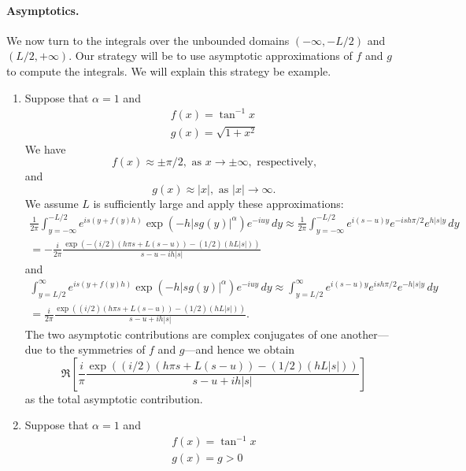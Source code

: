 \documentclass[11pt,letterpaper]{article}
\begin{document}
\paragraph{Asymptotics.} We now turn to the integrals over the unbounded domains $(-\infty, -L/2)$ and $(L/2, +\infty)$. Our strategy will be to use asymptotic approximations of $f$ and $g$ to compute the integrals. We will explain this strategy be example.

\begin{enumerate}
\item Suppose that $\alpha = 1$ and
\begin{gather*}
f(x) = \tan^{-1} x \\
g(x) = \sqrt{1 + x^2}
\end{gather*}
We have
\[
f(x) \approx \pm \pi/2, \text{ as } x \to \pm \infty, \text{ respectively,}
\]
and
\[
g(x) \approx |x|, \text{ as } |x| \to \infty.
\]
We assume $L$ is sufficiently large and apply these approximations:
\begin{multline*}
\frac{1}{2 \pi} \int_{y=-\infty}^{-L/2} e^{is\left(y+f(y)h\right)}\exp{\left(  -h |s g(y)|^{\alpha} \right)}e^{-iuy}\, dy \approx \frac{1}{2 \pi} \int_{y=-\infty}^{-L/2} e^{i(s-u)y} e^{-i s h \pi/2} e^{h |s| y} \, dy \\
 = - \frac{i}{2 \pi} \frac{\exp \left( - (i/2)(h \pi s + L(s-u)) - (1/2)(h L |s|) \right)}{s - u - i h |s|}
\end{multline*}
and
\begin{multline*}
\int_{y=L/2}^{\infty} e^{is\left(y+f(y)h\right)}\exp{\left(  -h |s g(y)|^{\alpha} \right)}e^{-iuy}\, dy \approx \int_{y=L/2}^{\infty} e^{i(s-u)y} e^{i s h \pi/2} e^{-h |s| y} \, dy \\
 = \frac{i}{2 \pi} \frac{\exp \left( (i/2)(h \pi s + L(s-u)) - (1/2)(h L |s|) \right)}{s - u + i h |s|}.
\end{multline*}
The two asymptotic contributions are complex conjugates of one another---due to the symmetries of $f$ and $g$---and hence we obtain
\begin{equation}
\label{eqn:asympcalc}
\Re \left[ \frac{i}{\pi} \frac{\exp \left( (i/2)(h \pi s + L(s-u)) - (1/2)(h L |s|) \right)}{s - u + i h |s|} \right]
\end{equation}
as the total asymptotic contribution.
\item Suppose that $\alpha = 1$ and
\begin{gather*}
f(x) = \tan^{-1} x \\
g(x) = g > 0
\end{gather*}

\end{enumerate}
\end{document}
